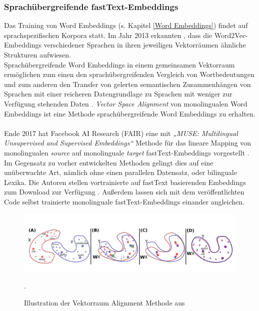 \documentclass[ngerman]{ttlab-qualify}
\begin{document}
\subsubsection{Sprachübergreifende fastText-Embeddings} \label{grundlage_muse}
Das Training von Word Embeddings (s. Kapitel \ref{Word Embeddings}) findet auf sprachspezifischen Korpora statt. Im Jahr 2013 erkannten \textcite{mikolov2013exploiting}, dass die Word2Vec-Embeddings verschiedener Sprachen in ihren jeweiligen Vektorräumen ähnliche Strukturen aufwiesen. \\
Sprachübergreifende Word Embeddings in einem gemeinsamen Vektorraum ermöglichen zum einen den sprachübergreifenden Vergleich von Wortbedeutungen und zum anderen den Transfer von gelerten semantischen Zusammenhängen von Sprachen mit einer reicheren Datengrundlage zu Sprachen mit weniger zur Verfügung stehenden Daten \parencite{ruder2019survey}.
\textit{Vector Space Alignment} von monolingualen Word Embeddings ist eine Methode sprachübergreifende Word Embeddings zu erhalten.\\
\\
 Ende 2017 hat Facebook AI Research (FAIR) eine mit \textit{„MUSE: Multilingual Unsupervised and Supervised Embeddings“} Methode für das lineare Mapping von monolingualen \textit{source} auf monolinguale \textit{target} fastText-Embeddings vorgestellt \parencite{conneau2017word}. Im Gegensatz zu vorher entwickelten Methoden gelingt dies auf eine unüberwachte Art, nämlich ohne einen parallelen Datensatz, oder bilinguale Lexika. Die Autoren stellen vortrainierte auf fastText basierenden Embeddings zum Download zur Verfügung \parencite{conneau2017word}. Außerdem lassen sich mit dem veröffentlichten Code selbst trainierte monolinguale fastText-Embeddings einander angleichen.
\begin{figure}[H]
\begin{center}
\includegraphics[width=16cm]{grafiken/MUSE_method.jpeg}
\caption[Illustration der Vektorraum Alignment Methode]{Illustration der Vektorraum Alignment Methode aus \textcite[3]{conneau2017word}}.
\label{MUSE}
\end{center}
\end{figure}
\end{document}
